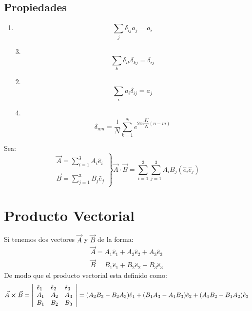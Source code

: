 \documentclass[../main]{subfiles}
\begin{document}
\subsection*{Propiedades}
\begin{minipage}{0.5\textwidth}
    \begin{enumerate}
        \item 
        $$
        \sum_j \delta_{ij} a_j=a_i
        $$
        \item[3.]
        $$
        \sum_k \delta_{ik} \delta_{kj}=\delta_{ij}
        $$
    \end{enumerate}
\end{minipage}
\begin{minipage}{0.5\textwidth}
    \begin{enumerate}
        \item[2.]
        $$
        \sum_i a_i \delta_{ij}=a_j
        $$
        \item[4.]
        $$
        \delta_{nm}=\dfrac{1}{N} \sum_{k=1}^N e^{2\pi i \dfrac{K}{N}(n-m)}
        $$
    \end{enumerate}
\end{minipage}
Sea:
\begin{equation}
    \left.
    \begin{array}{l}
         \Vec{A}=\sum_{i=1}^3 A_i \hat{e}_i \\ \\
         \Vec{B}=\sum_{j=1}^3 B_j \hat{e}_j
    \end{array}
    \right \}
    \Vec{A} \cdot \Vec{B}= \sum_{i=1}^3 \sum_{j=1}^3 A_i B_j (\hat{e}_i \hat{e}_j)
\end{equation}
\begin{center}
\end{center}
\section{Producto Vectorial}
Si tenemos dos vectores $\vec{A}$ y $\vec{B}$ de la forma:
\begin{align*}
    \vec{A}=A_1 \hat{e}_1 +A_2 \hat{e}_2 + A_3 \hat{e}_3 \\
    \vec{B}=B_1 \hat{e}_1 +B_2 \hat{e}_2 + B_3 \hat{e}_3
\end{align*}
De modo que el producto vectorial esta definido como:
\begin{equation}
    \vec{A}\cross \vec{B}=
    \left|
    \begin{array}{lll}
    \hat{e}_1 & \hat{e}_2 & \hat{e}_3\\
    A_1 & A_2 & A_3 \\
    B_1 & B_2 & B_3
    \end{array}
    \right|=
    (A_2 B_3 - B_2 A_3)\hat{e}_1+(B_1 A_3 - A_1 B_3)\hat{e}_2+(A_1 B_2- B_1 A_2)\hat{e}_3
\end{equation}
\end{document}
